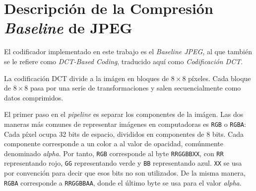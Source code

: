 \section{Descripción de la Compresión \emph{Baseline} de JPEG}

El codificador implementado en este trabajo es el \emph{Baseline JPEG}, al que también se le refiere como \emph{DCT-Based Coding}, traducido aquí como \emph{Codificación DCT}.

La codificación DCT divide a la imágen en bloques de $8\times8$ píxeles. Cada bloque de $8\times8$ pasa por una serie de transformaciones y salen secuencialmente como datos comprimidos.

El primer paso en el \emph{pipeline} es separar los componentes de la imágen. Las dos maneras más comunes de representar imágenes en computadoras es \verb+RGB+ o \verb+RGBA+: Cada píxel ocupa 32 bits de espacio, divididos en componentes de 8 bits. Cada componente corresponde a un color a al valor de opacidad, comúnmente denominado \emph{alpha}. Por tanto, \verb+RGB+ corresponde al byte \verb+RRGGBBXX+, con \verb+RR+ representando rojo, \verb+GG+ representando verde y \verb+BB+ representando azul. \verb+XX+ se usa por convención para decir que esos bits no son utilizados. De la misma manera, \verb+RGBA+ corresponde a \verb+RRGGBBAA+, donde el último byte se usa para el valor \emph{alpha}.


%
